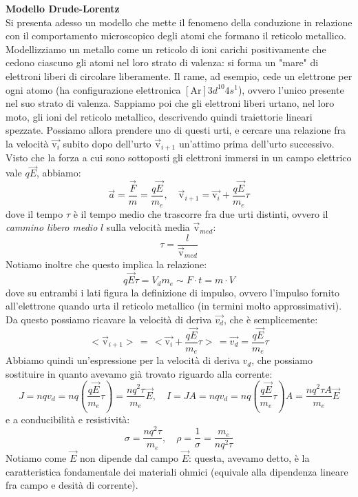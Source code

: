 \documentclass[a4paper,12pt]{article}
\begin{document}
\par\smallskip
\textbf{Modello Drude-Lorentz} \\
Si presenta adesso un modello che mette il fenomeno della conduzione in relazione con il comportamento microscopico degli atomi che formano il reticolo metallico. Modellizziamo un metallo come un reticolo di ioni carichi positivamente che cedono
ciascuno gli atomi nel loro strato di valenza: si forma un "mare" di elettroni liberi di circolare liberamente. Il rame, ad esempio, cede un elettrone per ogni atomo (ha configurazione elettronica $[\mathrm{Ar}]3d^{10} 4s^{1}$), ovvero l'unico presente nel suo strato di valenza.
Sappiamo poi che gli elettroni liberi urtano, nel loro moto, gli ioni del reticolo metallico, descrivendo quindi traiettorie lineari spezzate. Possiamo allora prendere uno di questi urti, e cercare una relazione fra la velocità $\vec{\mathrm{v}_i}$ subito dopo dell'urto 
$\vec{\mathrm{v}}_{i+1}$ un'attimo prima dell'urto successivo. Visto che la forza a cui sono sottoposti gli elettroni immersi in un campo elettrico vale $q\vec{E}$, abbiamo:
$$ \vec{a} = \frac{\vec{F}}{m} = \frac{q\vec{E}}{m_e}, \quad \vec{\mathrm{v}}_{i+1} = \vec{\mathrm{v}_i} + \frac{q\vec{E}}{m_e}\tau $$
dove il tempo $\tau$ è il tempo medio che trascorre fra due urti distinti, ovvero il \textit{cammino libero medio} $l$ sulla velocità media $\vec{\mathrm{v}}_{med}$:
$$ \tau = \frac{l}{\vec{\mathrm{v}}_{med}} $$
Notiamo inoltre che questo implica la relazione:
$$ q\vec{E}\tau = V_d m_e \sim F \cdot t = m \cdot V $$
dove su entrambi i lati figura la definizione di impulso, ovvero l'impulso fornito all'elettrone quando urta il reticolo metallico (in termini molto approssimativi).
Da questo possiamo ricavare la velocità di deriva $\vec{v_d}$, che è semplicemente:
$$ <\vec{\mathrm{v}}_{i+1}> \, = \, <\vec{\mathrm{v}_i} + \frac{q\vec{E}}{m_e}\tau> \, = \vec{v_d} = \frac{q\vec{E}}{m_e}\tau $$
Abbiamo quindi un'espressione per la velocità di deriva $v_d$, che possiamo sostituire in quanto avevamo già trovato riguardo alla corrente:
$$ J = nqv_d = nq\left( \frac{q\vec{E}}{m_e}\tau\right) = \frac{nq^2\tau}{m_e}\vec{E}, \quad I = JA = nqv_d = nq\left( \frac{q\vec{E}}{m_e}\tau\right)A = \frac{nq^2\tau A}{m_e}\vec{E} $$
e a conducibilità e resistività:
$$ \sigma = \frac{nq^2\tau}{m_e}, \quad \rho = \frac{1}{\sigma} = \frac{m_e}{nq^2\tau} $$
Notiamo come $\vec{E}$ non dipende dal campo $\vec{E}$: questa, avevamo detto, è la caratteristica fondamentale dei materiali ohmici (equivale alla dipendenza lineare fra campo e desità di corrente).
\par\smallskip
\end{document}

